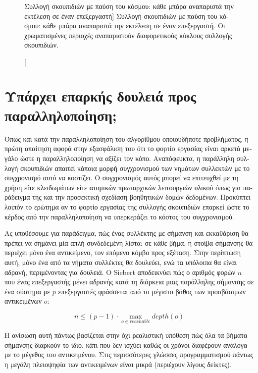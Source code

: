 \begin{greek}
\begin{figure}
  \caption
    [Συλλογή σκουπιδιών με παύση του κόσμου: κάθε μπάρα αναπαριστά
     την εκτέλεση σε έναν επεξεργαστή]
    {Συλλογή σκουπιδιών με παύση του κόσμου: κάθε μπάρα αναπαριστά
     την εκτέλεση σε έναν επεξεργαστή. Οι χρωματισμένες περιοχές
     αναπαριστούν διαφορετικούς κύκλους συλλογής σκουπιδιών.}
  \label{fig:par_1}
\end{figure}

\section{Υπάρχει επαρκής δουλειά προς παραλληλοποίηση;}
Όπως και κατά την παραλληλοποίηση του αλγορίθμου οποιουδήποτε
προβλήματος, η πρώτη απαίτηση αφορά στην εξασφάλιση του ότι
το φορτίο εργασίας είναι αρκετά μεγάλο ώστε η παραλληλοποίηση
να αξίζει τον κόπο. Αναπόφευκτα, η παράλληλη συλλογή σκουπιδιών
απαιτεί κάποια μορφή συγχρονισμού των νημάτων συλλεκτών με το
συγχρονισμό αυτό να κοστίζει. Ο συγχρονισμός αυτός μπορεί να
επιτευχθεί με τη χρήση είτε κλειδωμάτων είτε ατομικών πρωταρχικών
λειτουργιών υλικού όπως για παράδειγμα της \textenglish{}
και την προσεκτική σχεδίαση βοηθητικών δομών δεδομένων. Προκύπτει
λοιπόν το ερώτημα αν το φορτίο εργασίας της συλλογής σκουπιδιών
επαρκεί ώστε το κέρδος από την παραλληλοποίηση να υπερκεράζει το
κόστος του συγχρονισμού.

Ας υποθέσουμε για παράδειγμα, πώς ένας συλλέκτης με σήμανση
και εκκαθάριση θα πρέπει να σημάνει μία απλή συνδεδεμένη λίστα:
σε κάθε βήμα, η στοίβα σήμανσης θα περιέχει μόνο ένα αντικείμενο,
τον επόμενο κόμβο προς εξέταση. Στην περίπτωση αυτή, μόνο ένα από
τα νήματα συλλέκτες θα δουλεύει, ενώ τα υπόλοιπα θα είναι αδρανή,
περιμένοντας για δουλειά. Ο Siebert \cite{DBLP:conf/iwmm/Siebert08}
αποδεικνύει πώς ο αριθμός φορών $n$ που ένας επεξεργαστής μένει
αδρανής κατά τη διάρκεια μιας παράλληλης σήμανσης σε ένα σύστημα
με $p$ επεξεργαστές φράσσεται από το μέγιστο βάθος των προσβάσιμων
αντικειμένων $o$:

\begin{equation}
  n \leq (p-1) \cdot \max_{o \in reachable}{depth(o)}
  \label{eq:par_1}
\end{equation}

Η ανίσωση αυτή πάντως βασίζεται στην όχι ρεαλιστική υπόθεση
πώς όλα τα βήματα σήμανσης διαρκούν το ίδιο, κάτι που δεν ισχύει
καθώς οι χρόνοι διαφέρουν ανάλογα με το μέγεθος του αντικειμένου.
Στις περισσότερες γλώσσες προγραμματισμού πάντως η μεγάλη πλειοψηφία
των αντικειμένων είναι μικρά (περιέχουν λίγους δείκτες).


\end{greek}
